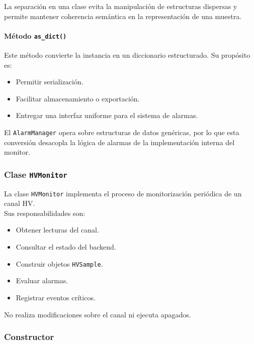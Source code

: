 \documentclass{article}
\begin{document}
La separación en una clase evita la manipulación de estructuras dispersas y permite mantener coherencia semántica en la representación de una muestra.

\paragraph{Método \texttt{as\_dict()}}

Este método convierte la instancia en un diccionario estructurado. 
Su propósito es:

\begin{itemize}
    \item Permitir serialización.
    \item Facilitar almacenamiento o exportación.
    \item Entregar una interfaz uniforme para el sistema de alarmas.
\end{itemize}

El \texttt{AlarmManager} opera sobre estructuras de datos genéricas, por lo que esta conversión desacopla la lógica de alarmas de la implementación interna del monitor.\\
 

\subsubsection{Clase \texttt{HVMonitor}}

La clase \texttt{HVMonitor} implementa el proceso de monitorización periódica de un canal HV. \\
Sus responsabilidades son:

\begin{itemize}
    \item Obtener lecturas del canal.
    \item Consultar el estado del backend.
    \item Construir objetos \texttt{HVSample}.
    \item Evaluar alarmas.
    \item Registrar eventos críticos.
\end{itemize}

No realiza modificaciones sobre el canal ni ejecuta apagados.\\


\subsubsection{Constructor}
\end{document}
